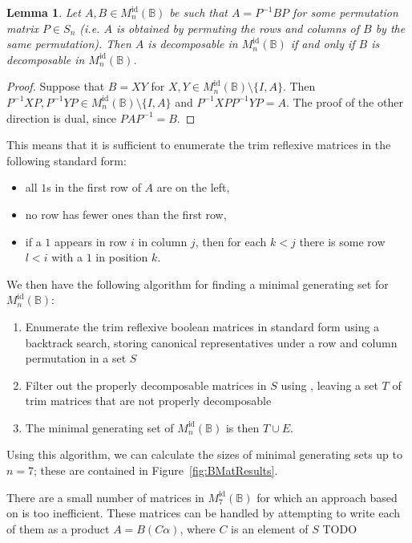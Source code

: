 \documentclass[11pt]{article}
\newtheorem{lemma}[thm]{Lemma}
\numberwithin{equation}{section}
\newcommand{\B}{\mathbb{B}}
\newcommand{\Refn}{M_n^{\text{id}}(\B)}
\newcommand{\Ref}[1]{M_{#1}^{\text{id}}(\B)}
\begin{document}
\begin{lemma}
  Let $A, B \in \Refn$ be such that $A = P^{-1} B P$ for some permutation matrix
  $P \in S_n$ (i.e. $A$ is obtained by permuting the rows and columns of $B$ by
  the same permutation). Then $A$ is decomposable in $\Refn$ if and only if $B$
  is decomposable in $\Refn$.
\end{lemma}
\begin{proof}
  Suppose that $B = XY$ for $X, Y \in \Refn\setminus \{I, A\}$. Then $P^{-1}XP,
  P^{-1}YP \in \Refn\setminus\{I, A\}$ and $P^{-1}XPP^{-1}YP = A$. The proof of
  the other direction is dual, since $PAP^{-1} = B$.
\end{proof}

This means that it is sufficient to enumerate the trim reflexive matrices in the
following standard form:
\begin{itemize}
  \item{all $1$s in the first row of $A$ are on the left,}
  \item{no row has fewer ones than the first row,}
  \item{if a $1$ appears in row $i$ in column $j$, then for each $k < j$ there
      is some row $l < i$ with a $1$ in position $k$.}
\end{itemize}

We then have the following algorithm for finding a minimal generating set for
$\Refn$:
\begin{enumerate}
  \item
    Enumerate the trim reflexive boolean matrices in standard form using a
    backtrack search, storing canonical representatives under a row and column
    permutation in a set $S$
  \item 
    Filter out the properly decomposable matrices in $S$ using
    , leaving a set $T$ of trim matrices that
    are not properly decomposable
  \item
    The minimal generating set of $\Refn$ is then $T \cup E$.
\end{enumerate}
Using this algorithm, we can calculate the sizes of minimal generating sets up
to $n = 7$; these are contained in Figure~\ref{fig:BMatResults}.

There are a small number of matrices in $\Ref{7}$ for which an approach based on
 is too inefficient. These matrices can be
handled by attempting to write each of them as a product $A = B(C\alpha)$, where
$C$ is an element of $S$ TODO
\end{document}
